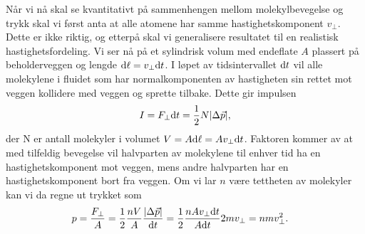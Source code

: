 Når vi nå skal se kvantitativt på sammenhengen mellom molekylbevegelse og trykk skal vi først anta at alle atomene har samme hastighetskomponent $v_\perp$. Dette er ikke riktig, og etterpå skal vi generalisere resultatet til en realistisk hastighetsfordeling.
Vi ser nå på et sylindrisk volum med endeflate $A$ plassert på beholderveggen og lengde $\text{d}\ell = v_\perp \text{d} t$. I løpet av tidsintervallet $\text{d} t$ vil alle molekylene i fluidet som har normalkomponenten av hastigheten sin rettet mot veggen kollidere med veggen og sprette tilbake. Dette gir impulsen
\begin{displaymath}
	I = F_\perp\text{d} t = \frac{1}{2} N|\Delta \vec{p}|,
\end{displaymath}
der N er antall molekyler i volumet $V = A\text{d}\ell  = Av_\perp\text{d} t$. Faktoren \half kommer av at med tilfeldig bevegelse vil halvparten av molekylene til enhver tid ha en hastighetskomponent mot veggen, mens andre halvparten har en hastighetskomponent bort fra veggen. Om vi lar $n$ være tettheten av molekyler kan vi da regne ut trykket som
\begin{displaymath}
\begin{aligned}
	p = \frac{F_\perp}{A} &= \frac{1}{2}\frac{nV}{A}\frac{|\Delta \vec{p}|}{\text{d} t} 
	= \frac{1}{2}\frac{nAv_\perp\text{d} t}{A\text{d} t}2mv_\perp 
	= nmv_\perp^2.
\end{aligned}
\end{displaymath}


